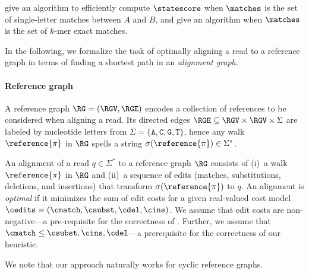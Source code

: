 \citet{hunt1977fast} give an algorithm to efficiently compute $\statescore$ when
$\matches$ is the set of single-letter matches between $A$ and $B$, and
\citet{deorowicz2014efficient} give an algorithm when $\matches$ is the set of
$k$-mer exact matches.


In the following, we formalize the task of optimally aligning a read to a
reference graph in terms of finding a shortest path in an \emph{alignment
graph}.

\paragraph{Reference graph}
%
A reference graph $\RG=(\RGV,\RGE)$ encodes a collection of references to be
considered when aligning a read. Its directed edges $\RGE \subseteq \RGV \times
\RGV \times \Sigma$ are labeled by nucleotide letters from $\Sigma =
\{\texttt{A},\texttt{C},\texttt{G},\texttt{T}\}$, hence any walk
$\reference{\pi}$ in $\RG$ spells a string $\sigma(\reference{\pi}) \in
\Sigma^*$.

An alignment of a read $q \in \Sigma^*$ to a reference graph $\RG$ consists of
(i)~a walk $\reference{\pi}$ in $\RG$ and (ii)~a sequence of edits (matches,
substitutions, deletions, and insertions) that transform
$\sigma(\reference{\pi})$ to $q$. An alignment is \emph{optimal} if it minimizes
the sum of edit costs for a given real-valued cost model $\cedits = (\cmatch,
\csubst,\cdel, \cins)$.
%
We assume that edit costs are non-negative---a pre-requisite for the correctness
of \A. Further, we assume that $\cmatch \leq \csubst, \cins, \cdel$---a
prerequisite for the correctness of our heuristic.

We note that our approach naturally works for cyclic reference graphs.


